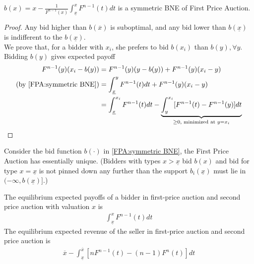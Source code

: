 \documentclass[11pt]{elegantbook_2}
\begin{document}
\begin{proposition}
    $b(x)=x-\frac{1}{F^{n-1}(x)}\int_{\underline{x}}^x F^{n-1}(t) dt$ is a symmetric BNE of First Price Auction.
\end{proposition}
\begin{proof}
    Any bid higher than $b(\overline{x})$ is suboptimal, and any bid lower than $b(\underline{x})$ is indifferent to the $b(\underline{x})$.\\
    We prove that, for a bidder with $x_i$, she prefers to bid $b(x_i)$ than $b(y),\forall y$.\\
    Bidding $b(y)$ gives expected payoff
    \begin{equation}
        \begin{aligned}
            F^{n-1}(y)(x_i-b(y))&=F^{n-1}(y)(y-b(y))+F^{n-1}(y)(x_i-y)\\
            (\textnormal{by \eqref{FPA:symmetric BNE}})&=\int_{\underline{x}}^y F^{n-1}(t) dt+F^{n-1}(y)(x_i-y)\\
            &=\int_{\underline{x}}^{x_i} F^{n-1}(t) dt-\underbrace{\int_y^{x_i} [F^{n-1}(t)-F^{n-1}(y)] dt}_{\geq 0, \textnormal{ minimized at }y=x_i}
        \end{aligned}
        \nonumber
    \end{equation}
\end{proof}

\begin{theorem}[Lebrun, 1999]
    Consider the bid function $b(\cdot)$ in \eqref{FPA:symmetric BNE}, the First Price Auction has essentially unique. (Bidders with types $x>\underline{x}$ bid $b(x)$ and bid for type $x=\underline{x}$ is not pinned down any further than the support $b_i(\underline{x})$ must lie in $(-\infty,b(\underline{x})]$.)
\end{theorem}

The equilibrium expected payoffs of a bidder in first-price auction and second price auction with valuation $x$ is
\begin{equation}
    \begin{aligned}
        \int_{\underline{x}}^x F^{n-1}(t)dt
    \end{aligned}
    \nonumber
\end{equation}
The equilibrium expected revenue of the seller in first-price auction and second price auction is
\begin{equation}
    \begin{aligned}
        \overline{x}-\int_{\underline{x}}^{\overline{x}} [nF^{n-1}(t)-(n-1)F^n(t)]dt
    \end{aligned}
    \nonumber
\end{equation}
\end{document}
